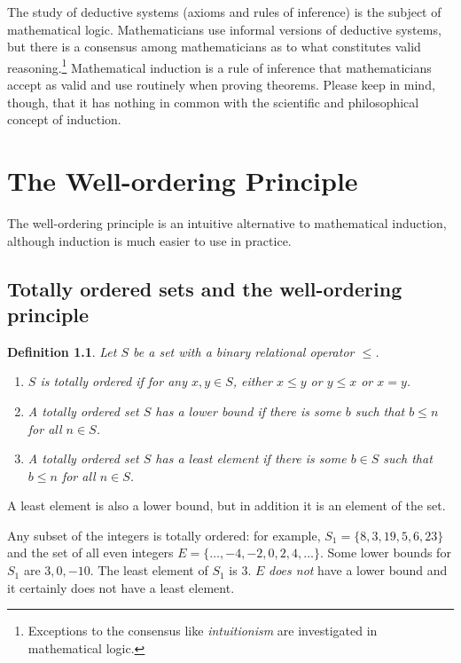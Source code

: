 \documentclass[11pt,a4paper]{report}
\newtheorem{definition}[theorem]{Definition}
\begin{document}
The study of deductive systems (axioms and rules of inference) is the subject of mathematical logic. Mathematicians use informal versions of deductive systems, but there is a consensus among mathematicians as to what constitutes valid reasoning.\footnote{Exceptions to the consensus like \emph{intuitionism} are investigated in mathematical logic.} Mathematical induction is a rule of inference that mathematicians accept as valid and use routinely when proving theorems. Please keep in mind, though, that it has nothing in common with the scientific and philosophical concept of induction.



\chapter{The Well-ordering Principle}\label{s.well}

The well-ordering principle is an intuitive alternative to mathematical induction, although induction is much easier to use in practice.

\section{Totally ordered sets and the well-ordering principle}

\begin{definition} Let $S$ be a set with a binary relational operator $\leq$.
\begin{enumerate}
\item $S$ is \emph{totally ordered} if for any $x,y\in S$, either $x\leq y$ or $y \leq x$ or $x=y$.
\item A totally ordered set $S$ has a \emph{lower bound} if there is some $b$ such that $b\leq n$ for all $n\in S$.
\item A totally ordered set $S$ has a \emph{least element} if there is some $b\in S$ such that $b\leq n$ for all $n\in S$.
\end{enumerate}
\end{definition}

A least element is also a lower bound, but in addition it is an element of the set.

Any subset of the integers is totally ordered: for example, $S_1=\{8,3,19,5,6,23\}$ and the set of all even integers $E=\{\ldots, -4, -2, 0, 2, 4, \ldots\}$. Some lower bounds for $S_1$ are $3, 0, -10$. The least element of $S_1$ is $3$. $E$ \emph{does not} have a lower bound and it certainly does not have a least element.
\end{document}
